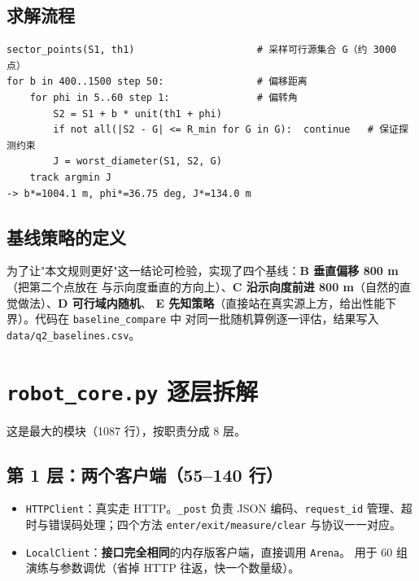 \subsection{求解流程}

\begin{lstlisting}[caption={问题二求解流程}]
sector_points(S1, th1)                     # 采样可行源集合 G（约 3000 点）
for b in 400..1500 step 50:                # 偏移距离
    for phi in 5..60 step 1:               # 偏转角
        S2 = S1 + b * unit(th1 + phi)
        if not all(|S2 - G| <= R_min for G in G):  continue   # 保证探测约束
        J = worst_diameter(S1, S2, G)
    track argmin J
-> b*=1004.1 m, phi*=36.75 deg, J*=134.0 m
\end{lstlisting}

\subsection{基线策略的定义}

为了让"本文规则更好"这一结论可检验，实现了四个基线：\textbf{B 垂直偏移 800 m}（把第二个点放在
与示向度垂直的方向上）、\textbf{C 沿示向度前进 800 m}（自然的直觉做法）、\textbf{D 可行域内随机}、
\textbf{E 先知策略}（直接站在真实源上方，给出性能下界）。代码在 \texttt{baseline\_compare} 中
对同一批随机算例逐一评估，结果写入 \texttt{data/q2\_baselines.csv}。

\section{\texttt{robot\_core.py} 逐层拆解}

这是最大的模块（1087 行），按职责分成 8 层。

\subsection{第 1 层：两个客户端（55--140 行）}

\begin{itemize}[leftmargin=1.8em]
  \item \texttt{HTTPClient}：真实走 HTTP。\texttt{\_post} 负责 JSON 编码、\texttt{request\_id}
        管理、超时与错误码处理；四个方法 \texttt{enter/exit/measure/clear} 与协议一一对应。
  \item \texttt{LocalClient}：\textbf{接口完全相同}的内存版客户端，直接调用 \texttt{Arena}。
        用于 60 组演练与参数调优（省掉 HTTP 往返，快一个数量级）。
\end{itemize}

